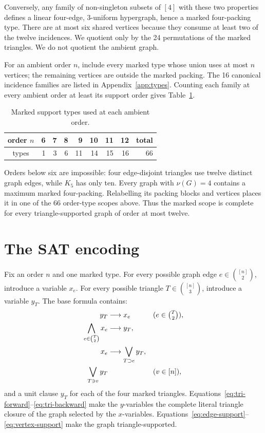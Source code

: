 \documentclass[11pt]{article}
\theoremstyle{definition}
\begin{document}
Conversely, any family of non-singleton subsets of $[4]$ with these two
properties defines a linear four-edge, $3$-uniform hypergraph, hence a marked
four-packing type.  There are at most six shared vertices because they consume
at least two of the twelve incidences.  We quotient only by the 24
permutations of the marked triangles.  We do not quotient the ambient graph.

For an ambient order $n$, include every marked type whose union uses at most
$n$ vertices; the remaining vertices are outside the marked packing.  The 16
canonical incidence families are listed in Appendix~\ref{app:types}.
Counting each family at every ambient order at least its support order gives
Table~\ref{tab:types}.

\begin{table}[ht]
\centering
\caption{Marked support types used at each ambient order.}\label{tab:types}
\begin{tabular}{crrrrrrrr}
\toprule
order $n$ & 6 & 7 & 8 & 9 & 10 & 11 & 12 & total \\
\midrule
types & 1 & 3 & 6 & 11 & 14 & 15 & 16 & 66 \\
\bottomrule
\end{tabular}
\end{table}

Orders below six are impossible: four edge-disjoint triangles use twelve
distinct graph edges, while $K_5$ has only ten.  Every graph with $\nu(G)=4$
contains a maximum marked four-packing.  Relabelling its packing blocks and
vertices places it in one of the 66 order-type scopes above.  Thus the marked
scope is complete for every triangle-supported graph of order at most twelve.

\section{The SAT encoding}\label{sec:sat}

Fix an order $n$ and one marked type.  For every possible graph edge
$e\in\binom{[n]}2$, introduce a variable $x_e$.  For every possible triangle
$T\in\binom{[n]}3$, introduce a variable $y_T$.  The base formula contains:
\begin{align}
  y_T &\longrightarrow x_e &&(e\in\tbinom{T}{2}),\label{eq:tri-forward}\\
  \bigwedge_{e\in\binom{T}{2}}x_e &\longrightarrow y_T,
      \label{eq:tri-backward}\\
  x_e &\longrightarrow \bigvee_{T\supset e}y_T,
      \label{eq:edge-support}\\
  \bigvee_{T\ni v}y_T &&& (v\in[n]),\label{eq:vertex-support}
\end{align}
and a unit clause $y_T$ for each of the four marked triangles.
Equations~\eqref{eq:tri-forward}--\eqref{eq:tri-backward} make the $y$-variables
the complete literal triangle closure of the graph selected by the
$x$-variables.  Equations~\eqref{eq:edge-support}--\eqref{eq:vertex-support}
make the graph triangle-supported.
\end{document}
